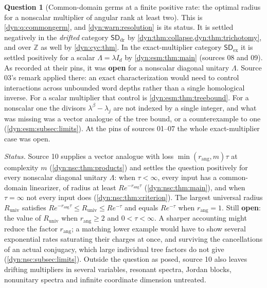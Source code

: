 \documentclass[11pt,letterpaper]{article}
\theoremstyle{definition}
\newtheorem{question}[question]{Question}
\theoremstyle{remark}
\newcommand{\Z}{\mathbb Z}
\newcommand{\sddr}{\mathsf{SD}_{\mathrm{dr}}}
\newcommand{\sdex}{\mathsf{SD}_{\mathrm{ex}}}
\newcommand{\rang}{r_{\mathrm{ang}}}
\numberwithin{equation}{section}
\begin{document}
\begin{question}[Common-domain germs at a finite positive rate: the optimal
radius for a nonscalar multiplier of angular rank at least two]\label{dyn:q:commongerm-restate}
This is \cref{dyn:q:commongerm}, and \cref{dyn:warn:resolution} is its
status. It is settled negatively in the \emph{drifted} category $\sddr$ by
\cref{dyn:thm:collapse,dyn:thm:trichotomy}, and over $\Z$ as well by
\cref{dyn:cyc:thm}. In the exact-multiplier category $\sdex$ it is settled
positively for a scalar $\Lambda=\lambda I_d$ by \cref{dyn:esm:thm:main}
(sources 08 and 09). As recorded at their pins, it was \textbf{open} for a
nonscalar diagonal unitary $\Lambda$. Source 03's remark applied there: an
exact characterization would need to control interactions across unbounded
word depths rather than a single homological inverse. For a scalar
multiplier that control is \cref{dyn:esm:thm:treebound}. For a nonscalar one
the divisors $\lambda^{\beta}-\lambda_j$ are not indexed by a single
integer, and what was missing was a vector analogue of the tree bound, or a
counterexample to one (\cref{dyn:esm:subsec:limits}). At the pins of
sources 01--07 the whole exact-multiplier case was open.

\emph{Status.} Source 10 supplies a vector analogue with loss
$\min(\rang,m)\tau$ at complexity $m$ (\cref{dyn:nsc:thm:products}) and
settles the question positively for every nonscalar diagonal unitary
$\Lambda$: when $\tau<\infty$, every input has a common-domain linearizer,
of radius at least $Re^{-\rang\tau}$ (\cref{dyn:nsc:thm:main}), and when
$\tau=\infty$ not every input does (\cref{dyn:nsc:thm:criterion}). The
largest universal radius $R_{\mathrm{univ}}$ satisfies
$Re^{-\rang\tau}\le R_{\mathrm{univ}}\le Re^{-\tau}$ and equals $Re^{-\tau}$
when $\rang=1$. Still \textbf{open}: the value of $R_{\mathrm{univ}}$ when
$\rang\ge2$ and $0<\tau<\infty$. A sharper accounting might reduce the
factor $\rang$; a matching lower example would have to show several
exponential rates saturating their charges at once, and surviving the
cancellations of an actual conjugacy, which large individual tree factors do
not give (\cref{dyn:nsc:subsec:limits}). Outside the question as posed,
source 10 also leaves drifting multipliers in several variables, resonant
spectra, Jordan blocks, nonunitary spectra and infinite coordinate
dimension untreated.
\end{question}
\end{document}
